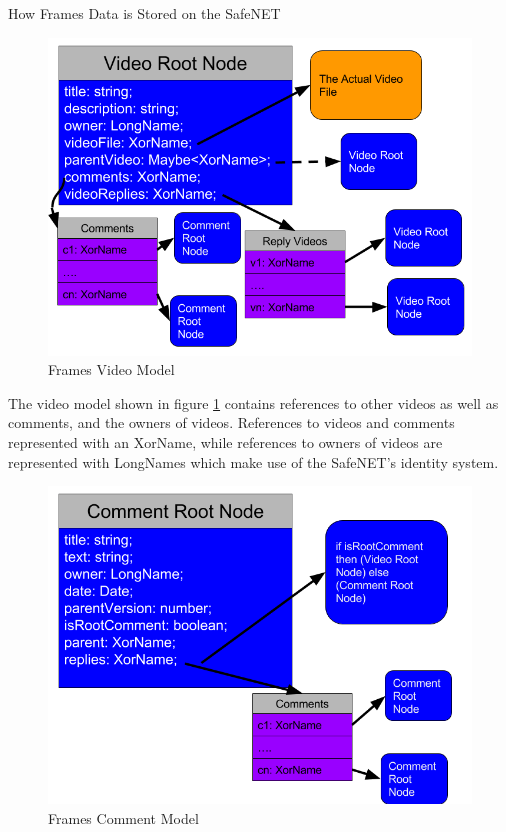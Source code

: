\documentclass[final]{beamer}
\newlength{\onecolwid}
\newlength{\twocolwid}
\begin{document}
\begin{frame}[t]
\begin{columns}[t]
\begin{column}{\twocolwid}
\begin{columns}[t,totalwidth=\twocolwid]
\begin{column}{\onecolwid}
\begin{block}{How Frames Data is Stored on the SafeNET}
  \begin{figure}
  \includegraphics[width=0.8\linewidth]{video-model.png}
  \caption{Frames Video Model}
  \label{fig:video-model}
  \end{figure}

  The video model shown in figure \ref{fig:video-model} contains references to
  other videos as well as comments, and the owners of videos. References to videos and comments
  represented with an XorName, while references to owners of videos are
  represented with LongNames which make use of the SafeNET's identity system.

  \begin{figure}
  \includegraphics[width=0.8\linewidth]{comment-model.png}
  \caption{Frames Comment Model}
  \label{fig:comment-model}
  \end{figure}

\end{block}



\end{column}
\end{columns}
\end{column}
\end{columns}
\end{frame}
\end{document}
